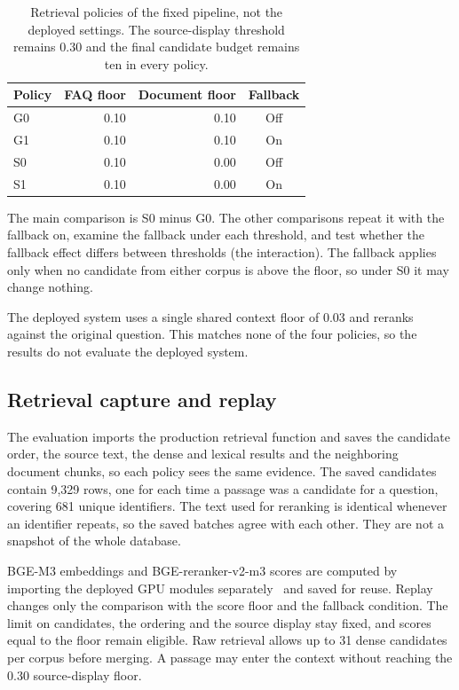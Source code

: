 \begin{table}[htbp]
\centering
\caption[Retrieval policies of the fixed pipeline, not the deployed settings]{Retrieval policies of the fixed pipeline, not the deployed settings. The source-display threshold remains 0.30 and the final candidate budget remains ten in every policy.}
\label{tab:thesis-policies}
\begin{tabular}{lrrc}
\toprule
Policy & FAQ floor & Document floor & Fallback \\
\midrule
G0 & 0.10 & 0.10 & Off \\
G1 & 0.10 & 0.10 & On \\
S0 & 0.10 & 0.00 & Off \\
S1 & 0.10 & 0.00 & On \\
\bottomrule
\end{tabular}
\end{table}

The main comparison is S0 minus G0. The other comparisons repeat it with the fallback on, examine the fallback under each threshold, and test whether the fallback effect differs between thresholds (the interaction). The fallback applies only when no candidate from either corpus is above the floor, so under S0 it may change nothing.

The deployed system uses a single shared context floor of 0.03 and reranks against the original question. This matches none of the four policies, so the results do not evaluate the deployed system.

\subsection{Retrieval capture and replay}

The evaluation imports the production retrieval function and saves the candidate order, the source text, the dense and lexical results and the neighboring document chunks, so each policy sees the same evidence. The saved candidates contain 9,329 rows, one for each time a passage was a candidate for a question, covering 681 unique identifiers. The text used for reranking is identical whenever an identifier repeats, so the saved batches agree with each other. They are not a snapshot of the whole database.

BGE-M3 embeddings and BGE-reranker-v2-m3 scores are computed by importing the deployed GPU modules separately~\cite{chen2024m3,baaiBgeRerankerV2M3} and saved for reuse. Replay changes only the comparison with the score floor and the fallback condition. The limit on candidates, the ordering and the source display stay fixed, and scores equal to the floor remain eligible. Raw retrieval allows up to 31 dense candidates per corpus before merging. A passage may enter the context without reaching the 0.30 source-display floor.


